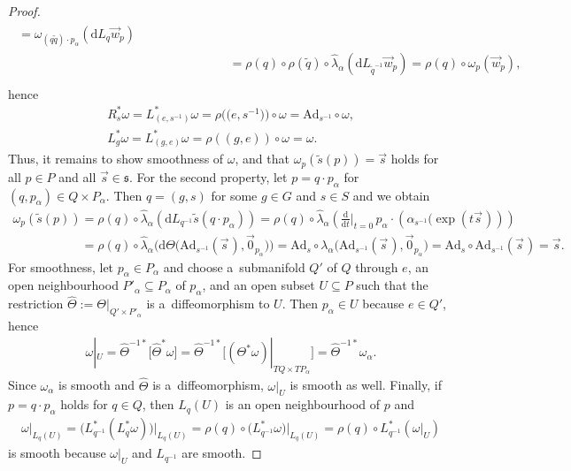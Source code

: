 \documentclass[11pt]{article}
\numberwithin{equation}{section}
\newcommand{\dttB}[2]{{\textstyle\frac{\mathrm{d}}{\mathrm{d}#1}}\big|_{#1=#2}}
\newcommand{\Co}[1]{\alpha_{#1}}
\newcommand{\wt}[1]{\widetilde{#1}}
\newcommand{\Add}[1]{\mathrm{Ad}_{#1}}
\begin{document}
\begin{proof}
\begin{gather*}
\begin{split}
=\omega_{(q\wt{q})\cdot p_\alpha}\left(\mathrm{d} L_q \vec{w}_{p}\right)
\\
&\phantom{\left(L_q^{*}\omega\right)_{p}(\vec{w}_{p})}
=\rho(q)\circ\rho\left(\wt{q}\right)\circ \widehat{\lambda}_\alpha\left(\mathrm{d}
L_{\wt{q}^{-1}}\vec{w}_{p}\right) =\rho(q)\circ \omega_{p}(\vec{w}_{p}),
\end{split}
\end{gather*}
hence
\begin{gather*}
R_s^{*}\omega\phantom{}=L_{\left(e,s^{-1}\right)}^{*}\omega=\rho\big(\big(e,s^{-1}\big)\big)\circ \omega
=\Add{s^{-1}}\circ \omega,
\\
L_g^{*}\omega =L_{(g,e)}^{*}\omega=\rho((g,e))\circ \omega=\omega.
\end{gather*}
Thus, it remains to show smoothness of $\omega$, and that $\omega_p(\widetilde{s}(p))=\vec{s}$ holds for all $p\in P$ and
all $\vec{s}\in \mathfrak{s}$.
For the second property, let $p=q\cdot p_\alpha$ for $(q,p_\alpha)\in Q\times P_\alpha$.
Then $q=(g,s)$ for some $g\in G$ and $s\in S$ and we obtain
\begin{gather*}
\omega_{p}(\widetilde{s}(p))=\rho(q)\circ \widehat{\lambda}_\alpha\left(\mathrm{d} L_{q^{-1}}\widetilde{s}(q\cdot
p_\alpha)\right)
=\rho(q)\circ \widehat{\lambda}_\alpha\left(\dttB{t}{0}\hspace{2pt} p_\alpha\cdot
\left(\Co{s^{-1}}(\exp(t\vec{s}\hspace{1pt})\right)\right)
\\
\phantom{\omega_{p}(\widetilde{s}(p))}
=\rho(q)\circ\widehat{\lambda}_\alpha
\big(\mathrm{d}\Theta\big(\Add{s^{-1}}(\vec{s}\hspace{1pt}),\vec{0}_{p_\alpha}\big)\big)\!
=\Add{s}\!\circ \lambda_\alpha\big(\Add{s^{-1}}(\vec{s}\hspace{1pt}),\vec{0}_{p_\alpha}\!\big)\!
=\Add{s}\circ\Add{s^{-1}}(\vec{s}\hspace{1pt})=\vec{s}.
\end{gather*}
For smoothness, let $p_\alpha\in P_\alpha$ and choose a~submanifold $Q'$ of $Q$ through $e$, an open neighbourhood
$P'_\alpha\subseteq P_\alpha$ of $p_\alpha$, and an open subset $U\subseteq P$ such that the restriction
$\widehat{\Theta}:=\Theta|_{Q' \times P'_\alpha}$ is a~dif\/feomorphism to $U$.
Then $p_\alpha \in U$ because $e\in Q'$, hence
\begin{gather*}
\omega|_U=\widehat{\Theta}^{-1*} \big[\widehat{\Theta}^{*}\omega\big]
=\widehat{\Theta}^{-1*} \big[(\Theta^{*}\omega)|_{TQ\times
TP_\alpha}\big] =\widehat{\Theta}^{-1*} \omega_\alpha.
\end{gather*}
Since $\omega_\alpha$ is smooth and $\widehat{\Theta}$ is a~dif\/feomorphism, $\omega|_U$ is smooth as well.
Finally, if $p=q\cdot p_\alpha$ holds for $q\in Q$, then $L_q(U)$ is an open neighbourhood of $p$ and
\begin{gather*}
\omega|_{L_q(U)}=\big(L_{q^{-1}}^{*}\left(L_q^{*}\omega\right)\big)\big|_{L_q(U)}= \rho(q)\circ
\big(L_{q^{-1}}^{*}\omega\big)\big|_{L_q(U)} =\rho(q)\circ L_{q^{-1}}^{*} \left(\omega|_U\right)
\end{gather*}
is smooth because $\omega|_U$ and $L_{q^{-1}}$ are smooth.
\end{proof}
\end{document}
